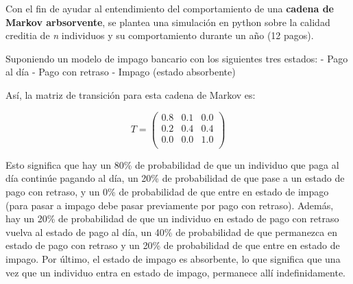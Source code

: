 \documentclass[
  a4paper,
  DIV=11,
  numbers=noendperiod]{scrreprt}
\begin{document}
Con el fin de ayudar al entendimiento del comportamiento de una
\textbf{cadena de Markov arbsorvente}, se plantea una simulación en
python sobre la calidad creditia de \emph{n} individuos y su
comportamiento durante un año (12 pagos).

Suponiendo un modelo de impago bancario con los siguientes tres estados:
- Pago al día - Pago con retraso - Impago (estado absorbente)

Así, la matriz de transición para esta cadena de Markov es:

\[
T = \begin{pmatrix}
0.8 & 0.1 & 0.0 \\
0.2 & 0.4 & 0.4 \\
0.0 & 0.0 & 1.0 \\
\end{pmatrix}
\]

Esto significa que hay un 80\% de probabilidad de que un individuo que
paga al día continúe pagando al día, un 20\% de probabilidad de que pase
a un estado de pago con retraso, y un 0\% de probabilidad de que entre
en estado de impago (para pasar a impago debe pasar previamente por pago
con retraso). Además, hay un 20\% de probabilidad de que un individuo en
estado de pago con retraso vuelva al estado de pago al día, un 40\% de
probabilidad de que permanezca en estado de pago con retraso y un 20\%
de probabilidad de que entre en estado de impago. Por último, el estado
de impago es absorbente, lo que significa que una vez que un individuo
entra en estado de impago, permanece allí indefinidamente.
\end{document}
